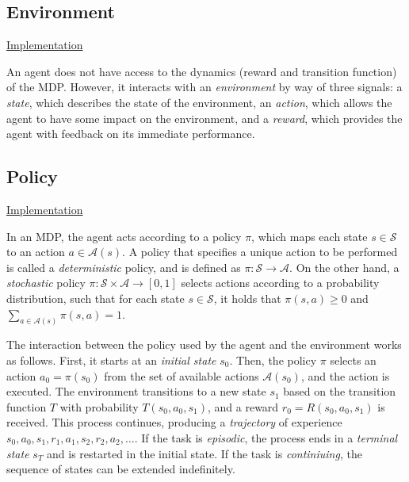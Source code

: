 \documentclass{article}
\newcommand{\GithubURL}[2]{
\noindent
\href{https://github.com/davidrobles/mlnd-capstone-code/blob/master/#1}{#2}
\break
}
\begin{document}
\subsection{Environment}

\GithubURL{capstone/environment/environment.py}{Implementation}

An agent does not have access to the dynamics (reward and transition function) of the MDP. However,
it interacts with an \emph{environment} by way of three signals: a \emph{state}, which describes the
state of the environment, an \emph{action}, which allows the agent to have some impact on the
environment, and a \emph{reward}, which provides the agent with feedback on its immediate
performance.

\subsection{Policy}

\GithubURL{capstone/policy/policy.py}{Implementation}

In an MDP, the agent acts according to a policy $\pi$, which maps each state $s \in \mathcal{S}$ to
an action $a \in \mathcal{A}(s)$. A policy that specifies a unique action to be performed is called
a \emph{deterministic} policy, and is defined as $\pi : \mathcal{S} \rightarrow \mathcal{A}$. On the
other hand, a \emph{stochastic} policy $\pi : \mathcal{S} \times \mathcal{A} \rightarrow [0,1]$
selects actions according to a probability distribution, such that for each state $s \in
\mathcal{S}$, it holds that $\pi(s,a) \geq 0$ and $\sum_{a\in\mathcal{A}(s)} \pi(s,a) = 1$.

The interaction between the policy used by the agent and the environment works as follows. First, it
starts at an \emph{initial state} $s_0$. Then, the policy $\pi$ selects an action $a_0 = \pi(s_0)$
from the set of available actions $\mathcal{A}(s_0)$, and the action is executed. The environment
transitions to a new state $s_1$ based on the transition function $T$ with probability
$T(s_0,a_0,s_1)$, and a reward $r_0 = R(s_0, a_0, s_1)$ is received. This process continues,
producing a \emph{trajectory} of experience $s_0, a_0, s_1, r_1, a_1, s_2, r_2, a_2, \dots$. If the
task is \emph{episodic}, the process ends in a \emph{terminal state} $s_T$ and is restarted in the
initial state. If the task is \emph{continiuing}, the sequence of states can be extended
indefinitely.
\end{document}
